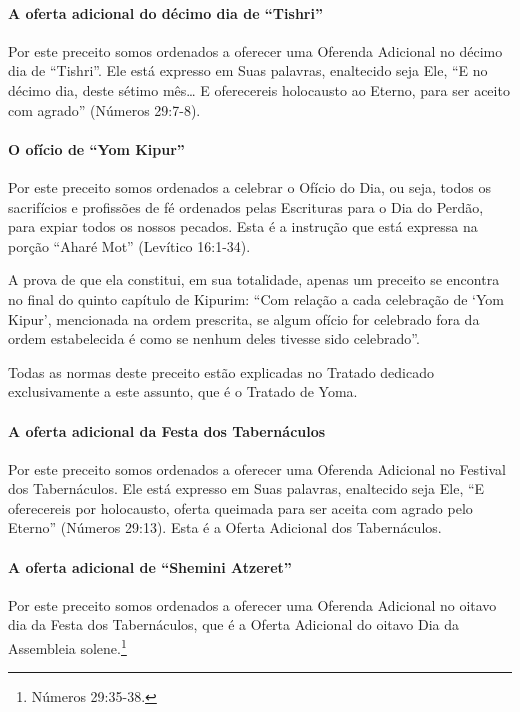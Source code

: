 \paragraph{A oferta adicional do décimo dia de ``Tishri''}

Por este preceito somos ordenados a oferecer uma Oferenda Adicional no
décimo dia de ``Tishri''. Ele está expresso em Suas palavras,
enaltecido seja Ele, ``E no décimo dia, deste sétimo mês\ldots{} E
oferecereis holocausto ao Eterno, para ser aceito com agrado'' (Números
29:7-8).

\paragraph{O ofício de ``Yom Kipur''}

Por este preceito somos ordenados a celebrar o Ofício do Dia, ou seja,
todos os sacrifícios e profissões de fé ordenados pelas Escrituras para
o Dia do Perdão, para expiar todos os nossos pecados. Esta é a instrução
que está expressa na porção ``Aharé Mot'' (Levítico 16:1-34).

A prova de que ela constitui, em sua totalidade, apenas um preceito se
encontra no final do quinto capítulo de Kipurim: ``Com relação a cada
celebração de `Yom Kipur', mencionada na ordem prescrita, se algum
ofício for celebrado fora da ordem estabelecida é como se nenhum deles
tivesse sido celebrado''.

Todas as normas deste preceito estão explicadas no Tratado dedicado
exclusivamente a este assunto, que é o Tratado de Yoma.

\paragraph{A oferta adicional da Festa dos Tabernáculos}

Por este preceito somos ordenados a oferecer uma Oferenda Adicional no
Festival dos Tabernáculos. Ele está expresso em Suas palavras,
enaltecido seja Ele, ``E oferecereis por holocausto, oferta queimada
para ser aceita com agrado pelo Eterno'' (Números 29:13). Esta é a
Oferta Adicional dos Tabernáculos.

\paragraph{A oferta adicional de ``Shemini Atzeret''}

Por este preceito somos ordenados a oferecer uma Oferenda Adicional no
oitavo dia da Festa dos Tabernáculos, que é a Oferta Adicional do oitavo
Dia da Assembleia solene.\footnote{Números 29:35-38.}

